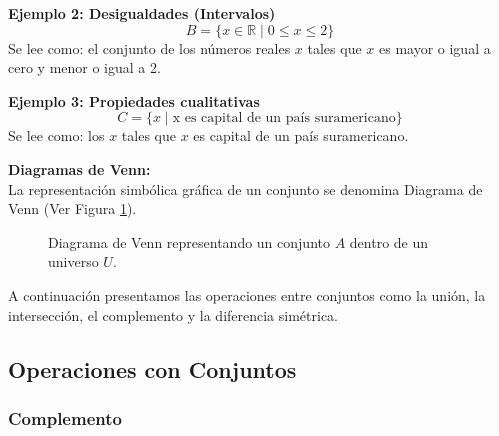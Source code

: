\vspace{0.3cm}

\noindent \textbf{Ejemplo 2: Desigualdades (Intervalos)} \\
\[ B = \{x \in \mathbb{R} \mid 0\leq x \leq 2 \} \]
Se lee como: el conjunto de los números reales $x$ tales que $x$ es mayor o igual a cero y menor o igual a 2.

\vspace{0.3cm}

\noindent \textbf{Ejemplo 3: Propiedades cualitativas} \\
\[ C= \{x \mid \text{x es capital de un país suramericano} \} \]
Se lee como: los $x$ tales que $x$ es capital de un país suramericano.

\vspace{0.5cm}

\textbf{Diagramas de Venn:} \\
La representación simbólica gráfica de un conjunto se denomina Diagrama de Venn (Ver Figura \ref{fig:Venn}).

\begin{figure}[ht]
\centering
{}
\caption{Diagrama de Venn representando un conjunto $A$ dentro de un universo $U$.}\label{fig:Venn}
\end{figure}

A continuación presentamos las operaciones entre conjuntos como la unión, la intersección, el complemento y la diferencia simétrica.

\subsection{Operaciones con Conjuntos}

\subsubsection{Complemento}

